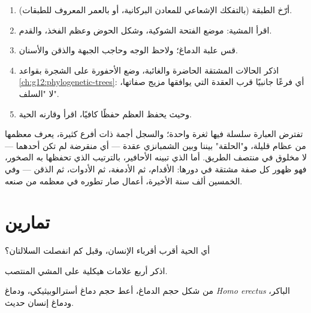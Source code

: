 \begin{method}\label{met:g12:human-evolution:placing}
\begin{enumerate}
  \item أرّخ الطبقة (بالتفكك الإشعاعي للمعادن البركانية، أو بالعمر
        المعروف للطبقات).
  \item اقرأ المشية: موضع الفتحة الشوكية، وشكل الحوض وعظم الفخذ،
        والقدم.
  \item قس علبة الدماغ؛ ولاحظ الوجه وحاجب الجبهة والذقن والأسنان.
  \item اذكر الحالات المشتقة الحاضرة والغائبة، وضع الأحفورة على
        الشجرة بقواعد \cref{ch:g12:phylogenetic-trees}: أي فرعًا
        جانبيًا قرب العقدة التي يوافقها مزيج صفاتها، لا "السلف".
  \item وحيث يحفظ العظم حفظًا كافيًا، اقرأ  وقارنه 
        الحية.
\end{enumerate}
\end{method}

\begin{remark}\label{rem:g12:human-evolution:link}
تفترض العبارة سلسلة فيها ثغرة واحدة؛ والسجل أجمة ذات أفرع كثيرة، يعرف
معظمها من عظام قليلة، و"الحلقة" بيننا وبين الشمبانزي عقدة --- أي 
منقرضة لم تكن أحدهما --- لا مخلوق في منتصف الطريق. أما الذي تبينه
الأحافير، بالترتيب الذي تحفظها به الصخور، فهو ظهور كل صفة مشتقة في
دورها: الأقدام، ثم الأدمغة، ثم الأدوات، ثم الذقن --- وفي الخمسين ألف
سنة الأخيرة، أعمال  صار تطوره في معظمه من صنعه.
\end{remark}

\section{تمارين}

\begin{exercise}[$\star$]\label{exo:g12:human-evolution:1}
أي  الحية أقرب أقرباء الإنسان، وقبل كم انفصلت السلالتان؟
\end{exercise}

\begin{exercise}[$\star$]\label{exo:g12:human-evolution:2}
اذكر أربع علامات هيكلية على المشي المنتصب.
\end{exercise}

\begin{exercise}[$\star$]\label{exo:g12:human-evolution:3}
من شكل حجم الدماغ، أعط حجم دماغ أسترالوبيثيكي، ودماغ
\emph{Homo erectus} الباكر، ودماغ إنسان حديث.
\end{exercise}

